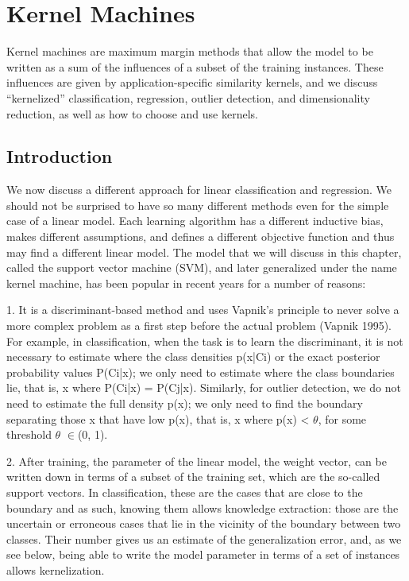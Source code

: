 \chapter{Kernel Machines}
\label{chap:13-kernel-machines}

Kernel machines are maximum margin methods that allow the model to be written as a sum of the influences of a subset of the training instances. These influences are given by application-specific similarity kernels, and we discuss “kernelized” classification, regression, outlier detection, and dimensionality reduction, as well as how to choose and use kernels.

\section{Introduction}

We now discuss a different approach for linear classification and regression. We should not be surprised to have so many different methods even for the simple case of a linear model. Each learning algorithm has a different inductive bias, makes different assumptions, and defines a different objective function and thus may find a different linear model. The model that we will discuss in this chapter, called the support vector machine (SVM), and later generalized under the name kernel machine, has been popular in recent years for a number of reasons:

1. It is a discriminant-based method and uses Vapnik’s principle to never solve a more complex problem as a first step before the actual problem (Vapnik 1995). For example, in classification, when the task is to learn the discriminant, it is not necessary to estimate where the class densities p(x|Ci) or the exact posterior probability values P(Ci|x); we only need to estimate where the class boundaries lie, that is, x where P(Ci|x) = P(Cj|x). Similarly, for outlier detection, we do not need to estimate the full density p(x); we only need to find the boundary separating those x that have low p(x), that is, x where p(x) < $\theta$, for some threshold $\theta$ $\in$(0, 1).

2. After training, the parameter of the linear model, the weight vector, can be written down in terms of a subset of the training set, which are the so-called support vectors. In classification, these are the cases that are close to the boundary and as such, knowing them allows knowledge extraction: those are the uncertain or erroneous cases that lie in the vicinity of the boundary between two classes. Their number gives us an estimate of the generalization error, and, as we see below, being able to write the model parameter in terms of a set of instances allows kernelization.


